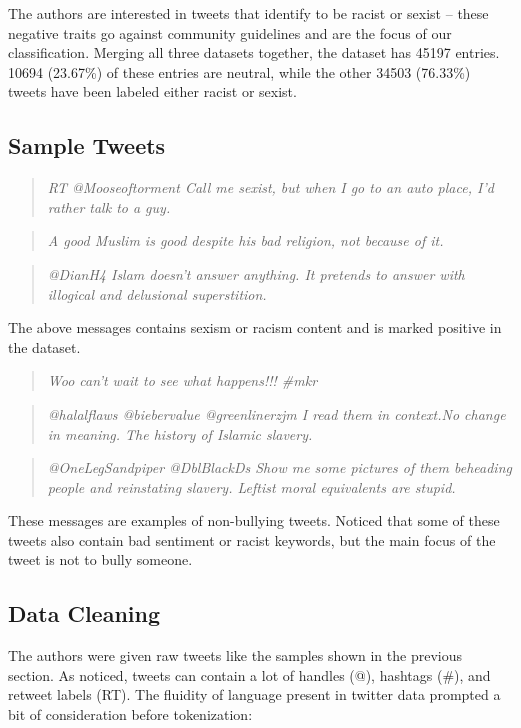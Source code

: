 \documentclass[conference]{IEEEtran}
\begin{document}
The authors are interested in tweets that identify to be racist or sexist -- these negative traits go against community guidelines and are the focus of our classification. Merging all three datasets together, the dataset has 45197 entries. 10694 (23.67\%)  of these entries are neutral, while the other 34503 (76.33\%) tweets have been labeled either racist or sexist.

\subsection{Sample Tweets}
\begin{quotation}
\emph{RT @Mooseoftorment Call me sexist, but when I go to an auto place, I'd rather talk to a guy.}
\end{quotation}
\begin{quotation}
\emph{A good Muslim is good despite his bad religion, not because of it.}
\end{quotation}
\begin{quotation}
\emph{@DianH4 Islam doesn't answer anything.  It pretends to answer with illogical and delusional superstition.}
\end{quotation}

The above messages contains sexism or racism content and is marked positive in the dataset.

\begin{quotation}
\emph{Woo can't wait to see what happens!!! \#mkr}
\end{quotation}
\begin{quotation}
\emph{@halalflaws @biebervalue @greenlinerzjm I read them in context.No change in meaning. The history of Islamic slavery.}
\end{quotation}
\begin{quotation}
\emph{@OneLegSandpiper @DblBlackDs Show me some pictures of them beheading people and reinstating slavery. Leftist moral equivalents are stupid.}
\end{quotation}

These messages are examples of non-bullying tweets. Noticed that some of these tweets also contain bad sentiment or racist keywords, but the main focus of the tweet is not to bully someone.

\subsection{Data Cleaning }

The authors were given raw tweets like the samples shown in the previous section. As noticed,  tweets can contain a lot of handles (@), hashtags (\#), and retweet labels (RT). The fluidity of language present in twitter data prompted a bit of consideration before tokenization:
\end{document}
